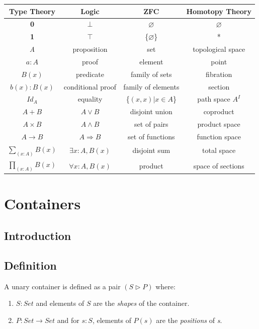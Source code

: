 \documentclass[12pt]{report}
\begin{document}
\begin{center}
\begin{tabular}{| c | c | c | c |}
\hline
\textbf{Type Theory} & \textbf{Logic} & \textbf{ZFC} & \textbf{Homotopy Theory}\\
\hline
\textbf{0} & $\bot$ & $\varnothing$ &$\varnothing$\\
\textbf{1} & $\top$ & \{$\varnothing$\} &*\\
\textit{A} & proposition & set & topological space\\
$a : A$ & proof & element & point\\
$B(x)$ & predicate & family of sets & fibration\\
$b(x) : B(x)$ & conditional proof & family of elements & section\\
$ Id_A $ & equality & \{$ (x,x) | x \in A $\} & path space $A^{\textit{I}}$\\
$A + B$ & $A \vee B$ & disjoint union & coproduct\\
$ A \times B$ & $A \wedge B$ & set of pairs & product space\\
$A \rightarrow B$ & $A \Rightarrow B$ & set of functions & function space\\
$ \sum_{(x:A)}^{} B(x) $ & $\exists x:A, B(x) $ & disjoint sum & total space\\
$ \prod_{(x:A)}^{} B(x) $ & $\forall x:A, B(x) $ & product & space of sections\\
\hline
\end{tabular}
\end{center}


\chapter{Containers}
\section{Introduction}


\section{Definition}
A unary container is defined as a pair $ (S \rhd P) $ where:
\begin{enumerate}
\item $S : Set$ and elements of $S$ are the \textit{shapes} of the container.
\item $P : Set \to Set$ and for $s : S$, elements of $P(s)$ are the \textit{positions} of \textit{s}.
\end{enumerate}
\end{document}
